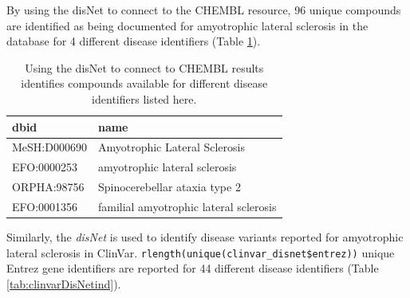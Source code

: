 \documentclass[9pt,a4paper,]{extarticle}
\begin{document}
By using the disNet to connect to the CHEMBL resource, 96 unique compounds are identified as being documented for amyotrophic lateral sclerosis in the database for 4 different disease identifiers (Table \ref{tab:chemblDisNetind}).

\begin{table}

\caption{\label{tab:chemblDisNetind}Using the disNet to connect to CHEMBL results identifies compounds available for different disease identifiers listed here.}
\centering
\begin{tabular}[t]{l|l}
\hline
dbid & name\\
\hline
MeSH:D000690 & Amyotrophic Lateral Sclerosis\\
\hline
EFO:0000253 & amyotrophic lateral sclerosis\\
\hline
ORPHA:98756 & Spinocerebellar ataxia type 2\\
\hline
EFO:0001356 & familial amyotrophic lateral sclerosis\\
\hline
\end{tabular}
\end{table}

Similarly, the \emph{disNet} is used to identify disease variants reported for amyotrophic lateral sclerosis in ClinVar. \texttt{rlength(unique(clinvar\_disnet\$entrez))} unique Entrez gene identifiers are reported for 44 different disease identifiers (Table \ref{tab:clinvarDisNetind}).
\end{document}
